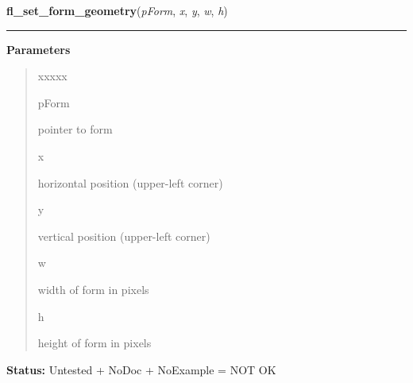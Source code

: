 \hspace{.8\funcindent}\begin{boxedminipage}{\funcwidth}

    \raggedright \textbf{fl\_set\_form\_geometry}(\textit{pForm}, \textit{x}, \textit{y}, \textit{w}, \textit{h})

    \vspace{-1.5ex}

    \rule{\textwidth}{0.5\fboxrule}
\setlength{\parskip}{2ex}
\setlength{\parskip}{1ex}
      \textbf{Parameters}
      \vspace{-1ex}

      \begin{quote}
        \begin{Ventry}{xxxxx}

          \item[pForm]

          pointer to form

          \item[x]

          horizontal position (upper-left corner)

          \item[y]

          vertical position (upper-left corner)

          \item[w]

          width of form in pixels

          \item[h]

          height of form in pixels

        \end{Ventry}

      \end{quote}

\textbf{Status:} Untested + NoDoc + NoExample = NOT OK



    \end{boxedminipage}

    \label{xformslib:library:fl_set_form_geometry}

    \vspace{0.5ex}

